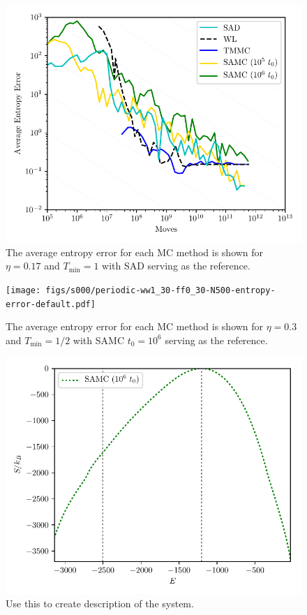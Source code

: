 \documentclass[letterpaper,twocolumn,amsmath,amssymb,pre,aps,10pt]{revtex4-1}
\begin{document}
\begin{figure}
\includegraphics[width=\columnwidth]{figs/s000/periodic-ww1_50-ff0_17-N256-entropy-error-defualt.pdf}
  \caption{The average entropy error for each MC method is shown for $\eta = 0.17$ and $T_{\min} = 1$ with
  SAD serving as the reference.}\label{fig:n256}
\end{figure}
\begin{figure}
\texttt{[image: figs/s000/periodic-ww1\_30-ff0\_30-N500-entropy-error-default.pdf]}
  \caption{The average entropy error for each MC method is shown for $\eta = 0.3$ and $T_{\min} = 1/2$ with
  SAMC $t_0 = 10^6$ serving as the reference.}\label{fig:n500-ff0.3}
\end{figure}
\begin{figure}
  \includegraphics[width=\columnwidth]{figs/N500-lndos-comparison}
  \caption{Use this to create description of the system.}\label{fig:n500-lndos-comparison}
\end{figure}
\end{document}

